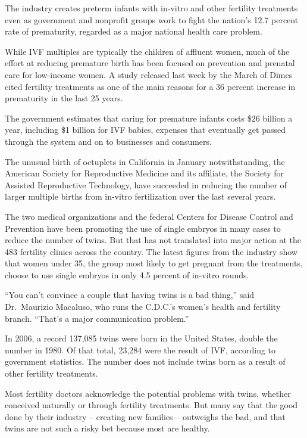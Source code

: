 ﻿\documentclass[12pt]{article}
\begin{document}
The industry creates preterm infants with in-vitro and other fertility treatments even as government
and nonprofit groups work to fight the nation's 12.7 percent rate of prematurity, regarded as a
major national health care problem.

While IVF multiples are typically the children of affluent women, much of the effort at reducing
premature birth has been focused on prevention and prenatal care for low-income women. A study
released last week by the March of Dimes cited fertility treatments as one of the main reasons for a
36 percent increase in prematurity in the last 25 years.

The government estimates that caring for premature infants costs \$26 billion a year, including \$1
billion for IVF babies, expenses that eventually get passed through the system and on to businesses
and consumers.

The unusual birth of octuplets in California in January notwithstanding, the American Society for
Reproductive Medicine and its affiliate, the Society for Assisted Reproductive Technology, have
succeeded in reducing the number of larger multiple births from in-vitro fertilization over the last
several years.

The two medical organizations and the federal Centers for Disease Control and Prevention have been
promoting the use of single embryos in many cases to reduce the number of twins. But that has not
translated into major action at the 483 fertility clinics across the country. The latest figures
from the industry show that women under 35, the group most likely to get pregnant from the
treatments, choose to use single embryos in only 4.5 percent of in-vitro rounds.

``You can't convince a couple that having twins is a bad thing,'' said Dr.~Maurizio Macaluso, who
runs the C.D.C.'s women's health and fertility branch. ``That's a major communication problem.''

In 2006, a record 137,085 twins were born in the United States, double the number in 1980. Of that
total, 23,284 were the result of IVF, according to government statistics. The number does not
include twins born as a result of other fertility treatments.

Most fertility doctors acknowledge the potential problems with twins, whether conceived naturally or
through fertility treatments. But many say that the good done by their industry -- creating new
families -- outweighs the bad, and that twins are not such a risky bet because most are healthy.
\end{document}

